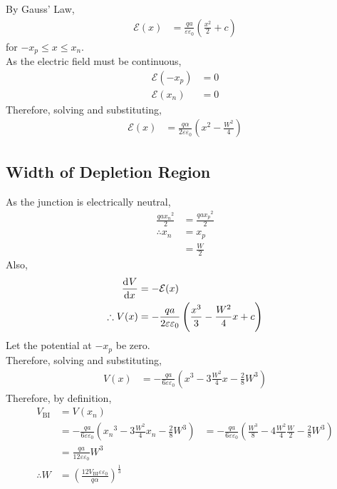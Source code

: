 \documentclass[titlepage, fleqn, a4paper, 12pt, twoside]{article}
\theoremstyle{definition}
\theoremstyle{theorem}
\begin{document}
By Gauss' Law,
\begin{align*}
	\mathcal{E}(x) & = \frac{q a}{\varepsilon \varepsilon_0} \left( \frac{x^2}{2} + c \right)
\end{align*}
for $-x_p \le x \le x_n$.\\
As the electric field must be continuous,
\begin{align*}
	\mathcal{E}(-x_p) & = 0 \\
	\mathcal{E}(x_n)  & = 0
\end{align*}
Therefore, solving and substituting,
\begin{align*}
	\mathcal{E}(x) & = \frac{q \alpha}{2 \varepsilon \varepsilon_0} \left( x^2 - \frac{W^2}{4} \right)
\end{align*}

\subsection{Width of Depletion Region}

As the junction is electrically neutral,
\begin{align*}
	\frac{q a {x_n}^2}{2} & = \frac{q a {x_p}^2}{2} \\
	\therefore x_n        & = x_p                   \\
                              & = \frac{W}{2}
\end{align*}
Also,
\begin{align*}
	\dod{V}{x}      & = -\mathcal{E}(x) \\
	\therefore V(x) & = -\frac{q a}{2 \varepsilon \varepsilon_0} \left( \frac{x^3}{3} - \frac{W^2}{4} x + c \right)
\end{align*}
Let the potential at $-x_p$ be zero.\\
Therefore, solving and substituting,
\begin{align*}
	V(x) & = -\frac{q a}{6 \varepsilon \varepsilon_0} \left( x^3 - 3 \frac{W^2}{4} x - \frac{2}{8} W^3 \right)
\end{align*}
Therefore, by definition,
\begin{align*}
	V_{\text{BI}} & = V(x_n)                                                                                                                \\
                      & = -\frac{q a}{6 \varepsilon \varepsilon_0} \left( {x_n}^3 - 3 \frac{W^2}{4} x_n - \frac{2}{8} W^3 \right)
                      & = -\frac{q a}{6 \varepsilon \varepsilon_0} \left( \frac{W^3}{8} - 4 \frac{W^2}{4} \frac{W}{2} - \frac{2}{8} W^3 \right) \\
                      & = \frac{q a}{12 \varepsilon \varepsilon_0} W^3                                                                          \\
	\therefore W  & = \left( \frac{12 V_{\text{BI}} \varepsilon \varepsilon_0}{q \alpha} \right)^{\frac{1}{3}}
\end{align*}
\end{document}
